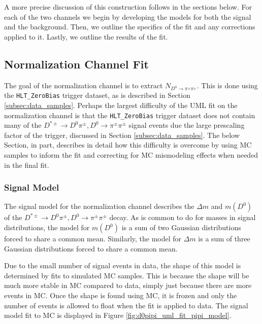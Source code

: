 A more precise discussion of this construction follows in the sections below. For each of the two channels we begin by developing the models for both the signal and the background. Then, we outline the specifics of the fit and any corrections applied to it. Lastly, we outline the results of the fit. 

\subsection{Normalization Channel Fit}
\label{subsec:normalization_channel_fit}

The goal of the normalization channel is to extract $N_{D^0 \to \pi^\pm \pi^\pm}$. This is done using the \texttt{HLT\_ZeroBias} trigger dataset, as is described in Section \ref{subsec:data_samples}. Perhaps the largest difficulty of the UML fit on the normalization channel is that the \texttt{HLT\_ZeroBias} trigger dataset does not contain many of the $D^{*\pm}\to D^0 \pi^\pm, D^0 \to \pi^\pm \pi^\pm$ signal events due the large prescaling factor of the trigger, discussed in Section \ref{subsec:data_samples}. The below Section, in part, describes in detail how this difficulty is overcome by using MC samples to inform the fit and correcting for MC mismodeling effects when needed in the final fit. 

\subsubsection{Signal Model}

The signal model for the normalization channel describes the $\Delta m$ and $m(D^0)$ of the $D^{*\pm}\to D^0 \pi^\pm, D^0 \to \pi^\pm \pi^\pm$ decay. As is common to do for masses in signal distributions, the model for $m(D^0)$ is a sum of two Gaussian distributions forced to share a common mean. Similarly, the model for $\Delta m$ is a sum of three Gaussian distributions forced to share a common mean.

Due to the small number of signal events in data, the shape of this model is determined by fits to simulated MC samples. This is because the shape will be much more stable in MC compared to data, simply just because there are more events in MC. Once the shape is found using MC, it is frozen and only the number of events is allowed to float when the fit is applied to data. The signal model fit to MC is displayed in Figure \ref{fig:d0pipi_uml_fit_pipi_model}.

